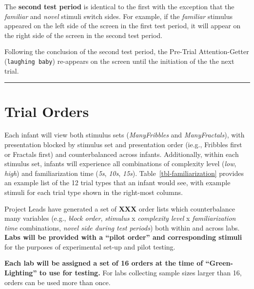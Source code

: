 \documentclass[
  letterpaper,
  DIV=11,
  numbers=noendperiod,
  oneside]{scrreprt}
\begin{document}
The \textbf{second test period} is identical to the first with the
exception that the \emph{familiar} and \emph{novel} stimuli switch
sides. For example, if the \emph{familiar} stimulus appeared on the left
side of the screen in the first test period, it will appear on the right
side of the screen in the second test period.

Following the conclusion of the second test period, the Pre-Trial
Attention-Getter (\texttt{laughing\ baby}) re-appears on the screen
until the initiation of the the next trial.

\begin{center}\rule{0.5\linewidth}{0.5pt}\end{center}

\section{Trial Orders}\label{trial-orders}

Each infant will view both stimulus sets (\emph{ManyFribbles} and
\emph{ManyFractals}), with presentation blocked by stimulus set and
presentation order (ie.g., Fribbles first or Fractals first) and
counterbalanced across infants. Additionally, within each stimulus set,
infants will experience all combinations of complexity level
(\emph{low}, \emph{high}) and familiarization time (\emph{5s},
\emph{10s}, \emph{15s}). Table~\ref{tbl-familiarization} provides an
example list of the 12 trial types that an infant would see, with
example stimuli for each trial type shown in the right-most columns.

Project Leads have generated a set of \textbf{XXX} order lists which counterbalance many variables
(e.g., \emph{block order}, \emph{stimulus} x \emph{complexity level} x
\emph{familiarization time} combinations, \emph{novel side during test
periods}) both within and across labs. \textbf{Labs will be provided
with a ``pilot order'' and corresponding stimuli} for the purposes of
experimental set-up and pilot testing.

\textbf{Each lab will be assigned a set of 16 orders at the time of
``Green-Lighting'' to use for testing.} For labs collecting sample sizes
larger than 16, orders can be used more than once.
\end{document}
